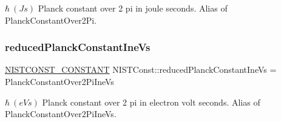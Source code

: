 $\hbar \ (J s)$ Planck constant over 2 pi in joule seconds. Alias of Planck\+Constant\+Over2\+Pi. \mbox{\label{group___n_i_s_t_const-_planck_constant_ga0c6caaacccb3fd7fb2fac8c4fa0847a5}} 
\subsubsection{\texorpdfstring{reduced\+Planck\+Constant\+Ine\+Vs}{reducedPlanckConstantIneVs}}
{\footnotesize\ttfamily \mbox{\hyperlink{group___n_i_s_t_const-_macros_ga2b0fc1d7452373f816175dd86ce26729}{N\+I\+S\+T\+C\+O\+N\+S\+T\+\_\+\+C\+O\+N\+S\+T\+A\+NT}} N\+I\+S\+T\+Const\+::reduced\+Planck\+Constant\+Ine\+Vs = Planck\+Constant\+Over2\+Pi\+Ine\+Vs}

$\hbar \ (eV s)$ Planck constant over 2 pi in electron volt seconds. Alias of Planck\+Constant\+Over2\+Pi\+Ine\+Vs. 